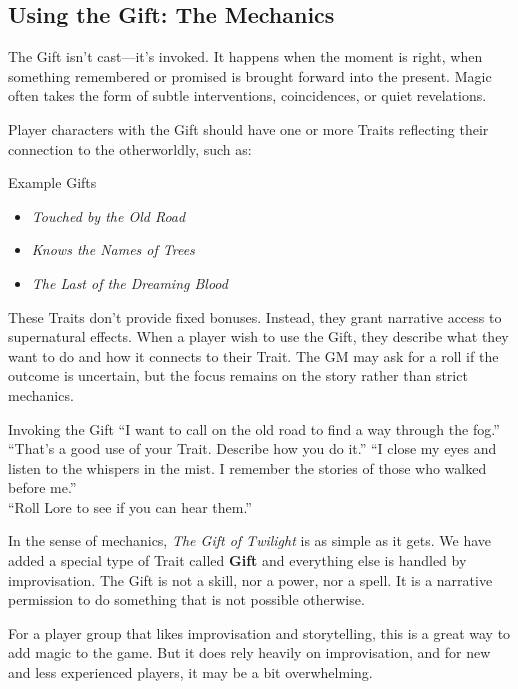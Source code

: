 \subsection{Using the Gift: The Mechanics}

The Gift isn’t cast—it’s invoked. It happens when the moment is right, when something remembered or promised is brought forward into the present. Magic often takes the form of subtle interventions, coincidences, or quiet revelations.

Player characters with the Gift should have one or more Traits reflecting their connection to the otherworldly, such as:  
\begin{Example}{Example Gifts}
    \begin{itemize}
        \item \textit{Touched by the Old Road}  
        \item \textit{Knows the Names of Trees}  
        \item \textit{The Last of the Dreaming Blood}  
    \end{itemize}
\end{Example}

These Traits don’t provide fixed bonuses. Instead, they grant narrative access to supernatural effects. When a player wish to use the Gift, they describe what they want to do and how it connects to their Trait. The GM may ask for a roll if the outcome is uncertain, but the focus remains on the story rather than strict mechanics.

\begin{ExampleGame}{Invoking the Gift}
    \line[Player] “I want to call on the old road to find a way through the fog.”
    \line[GM]     “That’s a good use of your Trait. Describe how you do it.”
    \line[Player] “I close my eyes and listen to the whispers in the mist. I remember the stories of those who walked before me.”  \\
    \line[GM]     “Roll Lore to see if you can hear them.”
\end{ExampleGame}

In the sense of mechanics, \emph{The Gift of Twilight} is as simple as it gets. We have added a special type of Trait called \textbf{Gift} and everything else is handled by improvisation. The Gift is not a skill, nor a power, nor a spell. It is a narrative permission to do something that is not possible otherwise.

For a player group that likes improvisation and storytelling, this is a great way to add magic to the game. But it does rely heavily on improvisation, and for new and less experienced players, it may be a bit overwhelming.

